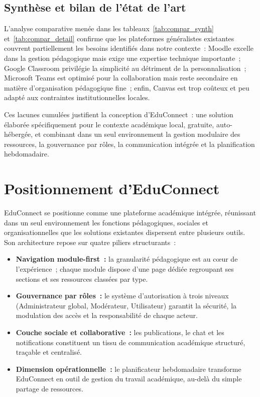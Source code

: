 ﻿\documentclass[12pt,a4paper,oneside]{report}
\begin{document}

\subsection{Synth\`ese et bilan de l'\'etat de l'art}

L'analyse comparative men\'ee dans les tableaux~\ref{tab:compar_synth} et~\ref{tab:compar_detail} confirme que les plateformes g\'en\'eralistes existantes couvrent partiellement les besoins identifi\'es dans notre contexte~: Moodle excelle dans la gestion p\'edagogique mais exige une expertise technique importante~; Google Classroom privil\'egie la simplicit\'e au d\'etriment de la personnalisation~; Microsoft Teams est optimis\'e pour la collaboration mais reste secondaire en mati\`ere d'organisation p\'edagogique fine~; enfin, Canvas est trop co\^uteux et peu adapt\'e aux contraintes institutionnelles locales.

Ces lacunes cumul\'ees justifient la conception d'EduConnect~: une solution \'elabor\'ee sp\'ecifiquement pour le contexte acad\'emique local, gratuite, auto-h\'eberg\'ee, et combinant dans un seul environnement la gestion modulaire des ressources, la gouvernance par r\^oles, la communication int\'egr\'ee et la planification hebdomadaire.

\section{Positionnement d'EduConnect}
\label{sec:positionnement}

EduConnect se positionne comme une plateforme acad\'emique int\'egr\'ee, r\'eunissant dans un seul environnement les fonctions p\'edagogiques, sociales et organisationnelles que les solutions existantes dispersent entre plusieurs outils. Son architecture repose sur quatre piliers structurants~:

\begin{itemize}
  \item \textbf{Navigation module-first~:} la granularit\'e p\'edagogique est au c\oe ur de l'exp\'erience~; chaque module dispose d'une page d\'edi\'ee regroupant ses sections et ses ressources class\'ees par type.
  \item \textbf{Gouvernance par r\^oles~:} le syst\`eme d'autorisation \`a trois niveaux (Administrateur global, Mod\'erateur, Utilisateur) garantit la s\'ecurit\'e, la modulation des acc\`es et la responsabilit\'e de chaque acteur.
  \item \textbf{Couche sociale et collaborative~:} les publications, le chat et les notifications constituent un tissu de communication acad\'emique structur\'e, tra\c{c}able et centralis\'e.
  \item \textbf{Dimension op\'erationnelle~:} le planificateur hebdomadaire transforme EduConnect en outil de gestion du travail acad\'emique, au-del\`a du simple partage de ressources.
\end{itemize}
\end{document}
